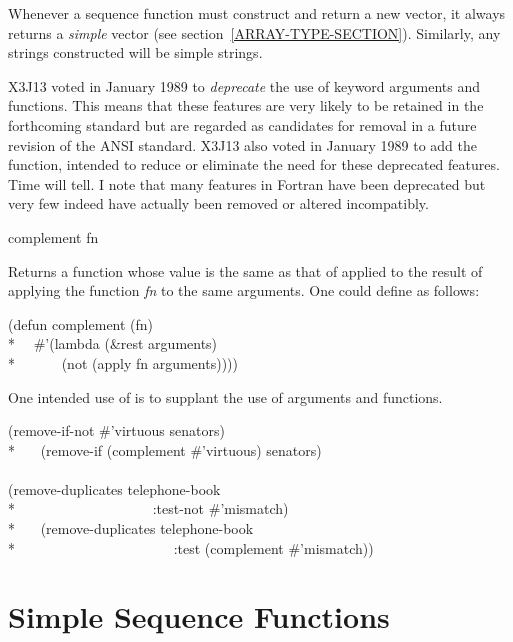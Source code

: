 Whenever a sequence function must construct and return
a new vector, it always returns a {\it simple}
vector (see section~\ref{ARRAY-TYPE-SECTION}).
Similarly, any strings constructed will be simple strings.

\begin{new}
X3J13 voted in January 1989
to {\it deprecate} the use of  keyword arguments
and  functions. This means that these features are very
likely to be retained in the forthcoming standard but are regarded as
candidates for removal in a future revision of the ANSI standard.
X3J13 also voted in January 1989
to add the  function, intended to reduce or eliminate the
need for these deprecated features.  Time will tell.  I note that
many features in Fortran have been deprecated but very few indeed
have actually been removed or altered incompatibly.

\begin{defun}[Function]
complement fn

Returns a function whose value is the same as that of 
applied to the result of applying the function {\it fn} to the same
arguments.  One could define  as follows:
\begin{lisp}
(defun complement (fn) \\*
~~\#'(lambda (\&rest arguments) \\*
~~~~~~(not (apply fn arguments))))
\end{lisp}

One intended use of  is to supplant the use of
 arguments and  functions.
\begin{lisp}
(remove-if-not \#'virtuous senators) {\EQ} \\*
~~~(remove-if (complement \#'virtuous) senators) \\
\\
(remove-duplicates telephone-book \\*
~~~~~~~~~~~~~~~~~~~:test-not \#'mismatch) {\EQ} \\*
~~~(remove-duplicates telephone-book \\*
~~~~~~~~~~~~~~~~~~~~~~:test (complement \#'mismatch))
\end{lisp}
\end{defun}
\end{new}

\section{Simple Sequence Functions}

